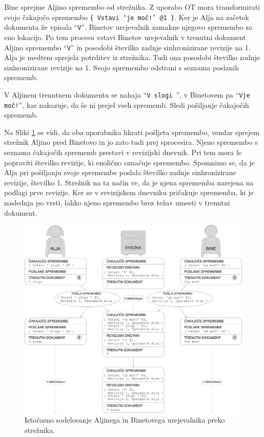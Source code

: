 \documentclass[a4paper, 12pt, twoside]{book}
\begin{document}
Bine sprejme Aljino spremembo od strežnika. Z uporabo OT mora transformirati svojo čakajočo spremembo {\tt \{ Vstavi ‘je moč!’ @1 \}}. Ker je Alja na začetek dokumenta že vpisala “{\tt V}”, Binetov urejevalnik zamakne njegovo spremembo za eno lokacijo. Po tem procesu vstavi Binetov urejevalnik v trenutni dokument Aljino spremembo “{\tt V}” in posodobi številko zadnje sinhronizirane revizije na 1. Alja je medtem sprejela potrditev iz strežnika. Tudi ona posodobi številko zadnje sinhronizirane revizije na 1. Svojo spremembo odstrani s seznama poslanih sprememb.

V Aljinem trenutnem dokumentu se nahaja “{\tt V slogi }”, v Binetovem pa “{\tt Vje moč!}”, kar nakazuje, da še ni prejel vseh sprememb. Sledi pošiljanje čakajočih sprememb.

Na Sliki \ref{pc4} se vidi, da oba uporabnika hkrati pošljeta spremembo, vendar sprejem strežnik Aljino pred Binetovo in jo zato tudi prej sprocesira. Njeno spremembo s seznama čakajočih sprememb prestavi v revizijski dnevnik. Pri tem mora le popraviti številko revizije, ki enolično označuje spremembo. Spomnimo se, da je Alja pri pošiljanju svoje spremembe poslala številko zadnje sinhronizirane revizije, številko 1. Strežnik na ta način ve, da je njena sprememba narejena na podlagi prve revizije. Ker se v revizijskem dnevniku pričakuje sprememba, ki je naslednja po vrsti, lahko njeno spremembo brez težav umesti v trenutni dokument.

\begin{figure}[placement h]
\begin{center}
\includegraphics[width=16cm]{img/pc4.pdf}
\end{center}
\caption{Istočasno sodelovanje Aljinega in Binetovega urejevalnika preko strežnika.}
\label{pc4}
\end{figure}
\end{document}

